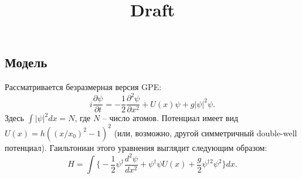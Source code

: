 \documentclass[12pt]{article}
\title{Draft}
\begin{document}
\maketitle

\newcommand{\sn}{\textrm{sn}}
\newcommand{\cn}{\textrm{cn}}
\newcommand{\dn}{\textrm{dn}}
\newcommand{\sd}{\textrm{sd}}
\newcommand{\cd}{\textrm{cd}}
\newcommand{\nd}{\textrm{nd}}
\newcommand{\am}{\textrm{am}}

\subsection*{Модель}

Рассматривается безразмерная версия GPE:
%
\begin{equation}
i \dfrac{\partial \psi}{\partial t} = -\dfrac{1}{2} \dfrac{\partial^2 \psi}{\partial x^2} + U(x) \psi + g |\psi|^2 \psi.
\label{eq:GPE} 
\end{equation}
%
Здесь $\int |\psi|^2 dx = N$, где $N$ -- число атомов.
Потенциал имеет вид $U(x) = h ((x/x_0)^2 - 1)^2$ (или, возможно, другой симметричный double-well потенциал).
Гаильтониан этого уравнения выглядит следующим образом:
%
\begin{equation}
H = \int \Big\{ -\dfrac{1}{2} \psi^\dag \dfrac{d^2 \psi}{dx^2} + \psi^\dag \psi U(x) + \dfrac{g}{2} \psi^{\dag 2} \psi^2  \Big\} dx.
\label{eq:gpe_hamiltonian}
\end{equation}
%
\end{document}
